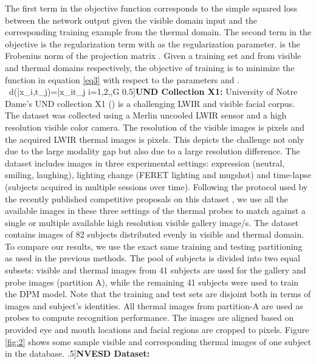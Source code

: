 \documentclass[smallextended,natbib]{svjour3}       \usepackage{graphicx}
\begin{document}
The first term in the objective function corresponds to the simple squared loss between the network output  given the visible domain input and the corresponding training example  from the thermal domain. The second term in the objective is the regularization term with  as the regularization parameter.  is the Frobenius norm of the projection matrix . Given a training set  and   from visible and thermal domains respectively, the objective of training is to minimize the function in equation \ref{eq3} with respect to the parameters  and .
\
d(\bar{x_i},t_j)=\bar{x_i}\cdot t_j \qquad\qquad \forall i=1,2,\cdots ,G
0.5\baselineskip]\noindent\textbf{UND Collection X1:} University of Notre Dame's UND collection X1 (\cite{chen2005ir}) is a challenging LWIR and visible facial corpus. The dataset was collected using a Merlin uncooled LWIR sensor and a high resolution visible color camera. The resolution of the visible images is  pixels and the acquired LWIR thermal images is  pixels. This depicts the challenge not only due to the large modality gap but also due to a large resolution difference. The dataset includes images in three experimental settings: expression (neutral, smiling, laughing), lighting change (FERET lighting and mugshot) and time-lapse (subjects acquired in multiple sessions over time). Following the protocol used by the recently published competitive proposals on this dataset \cite{hu2015, choi2012}, we use all the available images in these three settings of the thermal probes to match against a single or multiple available high resolution visible gallery image/s. The dataset contains  images of 82 subjects distributed evenly in visible and thermal domain. To compare our results, we use the exact same training and testing partitioning as used in the previous methods. The pool of subjects is divided into two equal subsets: visible and thermal images from 41 subjects are used for the gallery and probe images (partition A), while the remaining 41 subjects were used to train the DPM model. Note that the training and test sets are disjoint both in terms of images and subject's identities. All thermal images from partition-A are used as probes to compute recognition performance. The images are aligned based on provided eye and mouth locations and facial regions are cropped to  pixels. Figure \ref{fig:2} shows some sample visible and corresponding thermal images of one subject in the database.
\0.5\baselineskip]\noindent\textbf{NVESD Dataset:}
\end{document}
